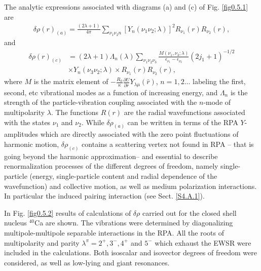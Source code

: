 The analytic expressions associated with diagrams (a) and (c) of Fig. \ref{fig0.5.1} are 
\begin{align}\label{eq0.1.127}
\delta\rho(r)_{(a)}=\frac{(2\lambda+1)}{4\pi}\sum_{\nu_1\nu_2 n}\left[Y_n(\nu_1\nu_2;\lambda)\right]^2 R_{\nu_1}(r)R_{\nu_2}(r),
\end{align}
and
\begin{align}\label{eq0.1.128}
\nonumber \delta\rho(r)_{(c)}&=(2\lambda+1)\Lambda_n(\lambda)\sum_{\nu_1\nu_2\nu_3}\frac{M(\nu_1,\nu_3;\lambda)}{\epsilon_{\nu_1}-\epsilon_{\nu_2}}(2j_1+1)^{-1/2}\\&\times Y_n(\nu_3\nu_2;\lambda)\times R_{\nu_1}(r)R_{\nu_2}(r),
\end{align}
where $M$ is the matrix element of $-\frac{R_0}{\kappa}\frac{\partial U}{\partial r}Y_{\lambda\mu}(\hat r)$,  $n=1,2\dots$ labeling the first, second, etc vibrational modes as a function of increasing energy, and $\Lambda_n$ is the strength of the particle-vibration coupling associated with the $n$-mode of multipolarity $\lambda$. The functions $R(r)$ are the radial wavefunctions associated with the states $\nu_1$ and $\nu_2$. While $\delta\rho_{(a)}$ can be written in terms of the RPA $Y$-amplitudes which are directly associated with the zero point fluctuations of harmonic motion, $\delta\rho_{(c)}$ contains a scattering vertex not found in RPA -- that is going beyond the harmonic approximation-- and essential to describe renormalization processes of the different degrees of freedom, namely single-particle (energy, single-particle content and radial dependence of the wavefunction) and collective motion, as well as medium polarization interactions. In particular the induced pairing interaction (see Sect. \ref{S4.A.1}). 

In Fig. \ref{fig0.5.2}  results of calculations of $\delta\rho$ carried out for the closed shell nucleus $^{40}$Ca are shown. The vibrations were determined by diagonalizing multipole-multipole separable interactions  in the RPA. All the roots of multipolarity and parity $\lambda^\pi=2^+,3^-,4^+$ and $5^-$ which exhaust the EWSR were included in the calculations. Both isoscalar and isovector degrees of freedom were considered, as well as  low-lying and giant resonances.

